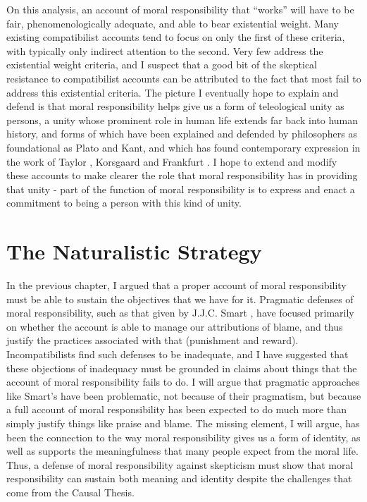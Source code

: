 \documentclass[phd,12pt,oneside,paper=letterpaper]{ubcthesis}
\begin{document}
On this analysis, an account of moral responsibility that ``works'' will have to be fair, phenomenologically adequate, and able to bear existential weight. Many existing compatibilist accounts tend to focus on only the first of these criteria, with typically only indirect attention to the second. Very few address the existential weight criteria, and I suspect that a good bit of the skeptical resistance to compatibilist accounts can be attributed to the fact that most fail to address this existential criteria. The picture I eventually hope to explain and defend is that moral responsibility helps give us a form of teleological unity as persons, a unity whose prominent role in human life extends far back into human history, and forms of which have been explained and defended by philosophers as foundational as Plato and Kant, and which has found contemporary expression in the work of Taylor \citeyearpar{taylor1989}, Korsgaard \citeyearpar{korsgaard1996, korsgaard2009} and Frankfurt \citeyearpar{frankfurt1971}. I hope to extend and modify these accounts to make clearer the role that moral responsibility has in providing that unity - part of the function of moral responsibility is to express and enact a commitment to being a person with this kind of unity.

\chapter{The Naturalistic Strategy}
In the previous chapter, I argued that a proper account of moral responsibility must be able to sustain the objectives that we have for it. Pragmatic defenses of moral responsibility, such as that given by J.J.C. Smart \citeyearpar{smart1961}, have focused primarily on whether the account is able to manage our attributions of blame, and thus justify the practices associated with that (punishment and reward). Incompatibilists find such defenses to be inadequate, and I have suggested that these objections of inadequacy must be grounded in claims about things that the account of moral responsibility fails to do. I will argue that pragmatic approaches like Smart's have been problematic, not because of their pragmatism, but because a full account of moral responsibility has been expected to do much more than simply justify things like praise and blame. The missing element, I will argue, has been the connection to the way moral responsibility gives us a form of identity, as well as supports the meaningfulness that many people expect from the moral life. Thus, a defense of moral responsibility against skepticism must show that moral responsibility can sustain both meaning and identity despite the challenges that come from the Causal Thesis.
 
\end{document}
